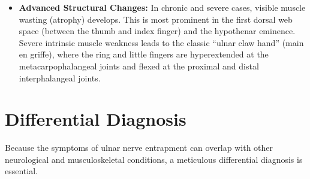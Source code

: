 \begin{itemize}
\begin{itemize}
  \item \textbf{Wartenberg's Sign:} Elicited when the patient is asked to adduct all fingers. The little finger remains abducted (drifted outwards) due to weakness of the third palmar interosseous muscle, while the extensor digiti minimi (innervated by the radial nerve) acts unopposed.
  \end{itemize}
\item \textbf{Advanced Structural Changes:} In chronic and severe cases, visible muscle wasting (atrophy) develops. This is most prominent in the first dorsal web space (between the thumb and index finger) and the hypothenar eminence. Severe intrinsic muscle weakness leads to the classic ``ulnar claw hand'' (main en griffe), where the ring and little fingers are hyperextended at the metacarpophalangeal joints and flexed at the proximal and distal interphalangeal joints.
\end{itemize}

\section*{Differential Diagnosis}
Because the symptoms of ulnar nerve entrapment can overlap with other neurological and musculoskeletal conditions, a meticulous differential diagnosis is essential.

